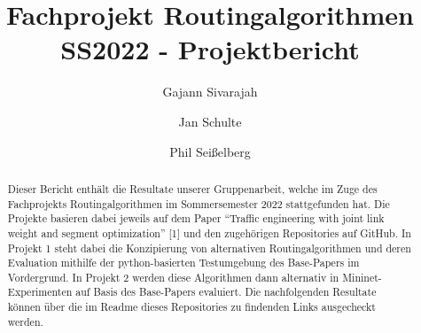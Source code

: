 \documentclass[sigconf,noacm,review]{acmart}
\begin{document}
\title{Fachprojekt Routingalgorithmen SS2022 - Projektbericht}



\author{Gajann Sivarajah}
\author{Jan Schulte}
\author{Phil Seißelberg}


\begin{abstract}
  Dieser Bericht enthält die Resultate unserer Gruppenarbeit, welche im Zuge des 
  Fachprojekts Routingalgorithmen im Sommersemester 2022 stattgefunden hat. 
  Die Projekte basieren dabei jeweils auf dem Paper ``Traffic engineering with joint link
  weight and segment optimization'' [1] und den zugehörigen Repositories auf GitHub.
  In Projekt 1 steht dabei die Konzipierung von alternativen Routingalgorithmen und deren Evaluation mithilfe der python-basierten Testumgebung des Base-Papers im Vordergrund.
  In Projekt 2 werden diese Algorithmen dann alternativ in Mininet-Experimenten auf Basis des Base-Papers evaluiert. Die nachfolgenden Resultate können über die im Readme dieses Repositories zu findenden Links
  ausgecheckt werden. 
  \end{abstract}

\maketitle
\end{document}
